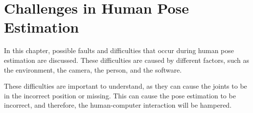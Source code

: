 \chapter{Challenges in Human Pose Estimation}
\label{sec:errors}
In this chapter, possible faults and difficulties that occur during human pose estimation are discussed. These difficulties are caused by different factors, such as the environment, the camera, the person, and the software. 

These difficulties are important to understand, as they can cause the joints to be in the incorrect position or missing. This can cause the pose estimation to be incorrect, and therefore, the human-computer interaction will be hampered.



